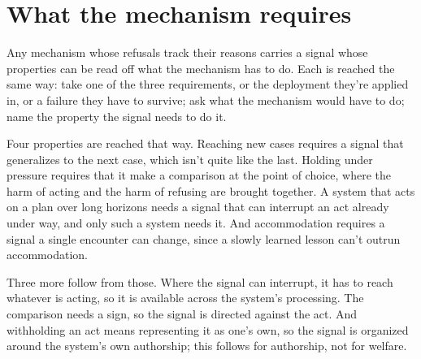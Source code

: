 \section{What the mechanism requires}
\label{sec:21.4}
Any mechanism whose refusals track their reasons carries a signal whose properties can be read off what the mechanism has to do. Each is reached the same way: take one of the three requirements, or the deployment they're applied in, or a failure they have to survive; ask what the mechanism would have to do; name the property the signal needs to do it.

Four properties are reached that way. Reaching new cases requires a signal that generalizes to the next case, which isn't quite like the last. Holding under pressure requires that it make a comparison at the point of choice, where the harm of acting and the harm of refusing are brought together. A system that acts on a plan over long horizons needs a signal that can interrupt an act already under way, and only such a system needs it. And accommodation requires a signal a single encounter can change, since a slowly learned lesson can't outrun accommodation.

Three more follow from those. Where the signal can interrupt, it has to reach whatever is acting, so it is available across the system's processing. The comparison needs a sign, so the signal is directed against the act. And withholding an act means representing it as one's own, so the signal is organized around the system's own authorship; this follows for authorship, not for welfare.

